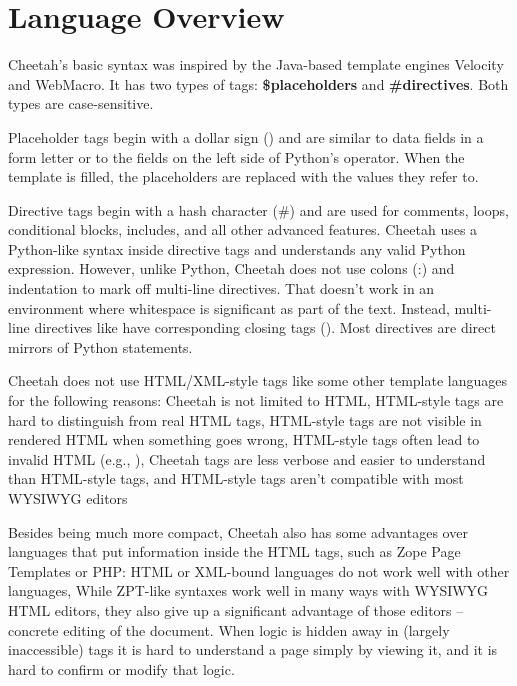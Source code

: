 \section{Language Overview}
\label{language}

Cheetah's basic syntax was inspired by the Java-based template engines Velocity
and WebMacro. It has two types of tags: {\bf \$placeholders} and {\bf
\#directives}.  Both types are case-sensitive.  

Placeholder tags begin with a dollar sign () and are similar to
data fields in a form letter or to the  fields on the left side
of Python's \code{\%} operator. When the template is filled, the placeholders
are replaced with the values they refer to.

Directive tags begin with a hash character (\#) and are used for comments,
loops, conditional blocks, includes, and all other advanced features. Cheetah
uses a Python-like syntax inside directive tags and understands any valid
Python expression.  However, unlike Python, Cheetah does not use colons (:) and
indentation to mark off multi-line directives.  That doesn't work in an
environment where whitespace is significant as part of the text.  Instead,
multi-line directives like  have  corresponding closing tags
 ().  Most directives are direct mirrors of Python statements.

Cheetah does not use HTML/XML-style tags like some other template languages for
the following reasons:
 Cheetah is not limited to HTML,
 HTML-style tags are hard to distinguish from real HTML tags,
 HTML-style tags are not visible in rendered HTML when something goes wrong,
 HTML-style tags often lead to invalid HTML (e.g., 
),
Cheetah tags are less verbose and easier to understand than HTML-style tags, 
and HTML-style tags aren't compatible with most WYSIWYG editors

Besides being much more compact, Cheetah also has some advantages over
languages that put information inside the HTML tags, such as Zope Page
Templates or PHP:
 HTML or XML-bound languages do not work well with other languages,
 While ZPT-like syntaxes work well in many ways with WYSIWYG HTML editors,
     they also give up a significant advantage of those editors -- concrete
     editing of the document.  When logic is hidden away in (largely
     inaccessible) tags it is hard to understand a page simply by viewing it,
     and it is hard to confirm or modify that logic.

